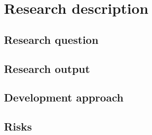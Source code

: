 \section{Research description}
\subsection{Research question}

\subsection{Research output}

\subsection{Development approach}

\subsection{Risks}